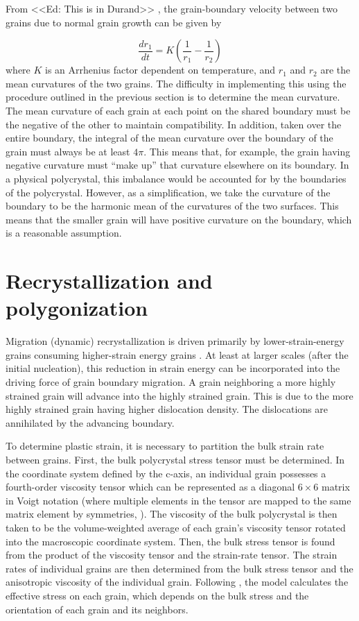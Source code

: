 \documentclass{igs}
\begin{document}
From \citet{durand2006} <<Ed: This is in Durand>> , the grain-boundary velocity between two grains due to normal grain growth can be given by

\begin{equation}
\frac{dr_1}{dt} = K \left( \frac{1}{r_1}-\frac{1}{r_2} \right)
\end{equation}
where $K$ is an Arrhenius factor dependent on temperature, and $r_1$ and $r_2$ are the mean curvatures of the two grains. The difficulty in implementing this using the procedure outlined in the previous section is to determine the mean curvature. The mean curvature of each grain at each point on the shared boundary must be the negative of the other to maintain compatibility. In addition, taken over the entire boundary, the integral of the mean curvature over the boundary of the grain must always be at least $4 \pi$. This means that, for example, the grain having negative curvature must ``make up'' that curvature elsewhere on its boundary. In a physical polycrystal, this imbalance would be accounted for by the boundaries of the polycrystal. However, as a simplification, we take the curvature of the boundary to be the harmonic mean of the curvatures of the two surfaces. This means that the smaller grain will have positive curvature on the boundary, which is a reasonable assumption. 

\section{Recrystallization and polygonization}
Migration (dynamic) recrystallization is driven primarily by lower-strain-energy grains consuming higher-strain energy grains \citep{duval1995}. At least at larger scales (after the initial nucleation), this reduction in strain energy can be incorporated into the driving force of grain boundary migration. A grain neighboring a more highly strained grain will advance into the highly strained grain. This is due to the more highly strained grain having higher dislocation density. The dislocations are annihilated by the advancing boundary. 

To determine plastic strain, it is necessary to partition the bulk strain rate between grains. First, the bulk polycrystal stress tensor must be determined. In the coordinate system defined by the c-axis, an individual grain possesses a fourth-order viscosity tensor which can be represented as a diagonal $6 \times 6$ matrix in Voigt notation (where multiple elements in the tensor are mapped to the same matrix element by symmetries, \citet{vnote}). The viscosity of the bulk polycrystal is then taken to be the volume-weighted average of each grain's viscosity tensor rotated into the macroscopic coordinate system. Then, the bulk stress tensor is found from the product of the viscosity tensor and the strain-rate tensor. The strain rates of individual grains are then determined from the bulk stress tensor and the anisotropic viscosity of the individual grain. Following \citet{azuma96}, the model calculates the effective stress on each grain, which depends on the bulk stress and the orientation of each grain and its neighbors.  
\end{document}
